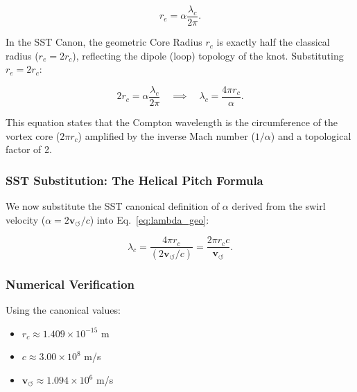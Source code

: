 \documentclass[10pt,reprint,aps,onecolumn,nofootinbib]{revtex4-2}
\begin{document}
            \begin{equation}
                r_e = \alpha \frac{\lambda_c}{2\pi}.
            \end{equation}

            In the SST Canon, the geometric Core Radius $r_c$ is exactly half the
            classical radius ($r_e = 2r_c$), reflecting the dipole (loop) topology
            of the knot. Substituting $r_e = 2r_c$:

            \begin{equation}
                2r_c = \alpha \frac{\lambda_c}{2\pi} \quad \implies \quad
                \lambda_c = \frac{4\pi r_c}{\alpha}.
                \label{eq:lambda_geo}
            \end{equation}

            This equation states that the Compton wavelength is the circumference of
            the vortex core ($2\pi r_c$) amplified by the inverse Mach number ($1/\alpha$)
            and a topological factor of 2.

        \subsubsection*{SST Substitution: The Helical Pitch Formula}

            We now substitute the SST canonical definition of $\alpha$ derived from
            the swirl velocity ($\alpha = 2 \mathbf{v}_{\!\boldsymbol{\circlearrowleft}} / c$) into Eq.~\eqref{eq:lambda_geo}:

            \begin{equation}
                \lambda_c = \frac{4\pi r_c}{(2 \mathbf{v}_{\!\boldsymbol{\circlearrowleft}} / c)}
                = \frac{2\pi r_c c}{\mathbf{v}_{\!\boldsymbol{\circlearrowleft}}}.
                \label{eq:SST_Compton}
            \end{equation}

        \subsubsection*{Numerical Verification}

            Using the canonical values:
            \begin{itemize}
                \item $r_c \approx 1.409 \times 10^{-15}$ m
                \item $c \approx 3.00 \times 10^8$ m/s
                \item $\mathbf{v}_{\!\boldsymbol{\circlearrowleft}} \approx 1.094 \times 10^6$ m/s
            \end{itemize}
\end{document}
